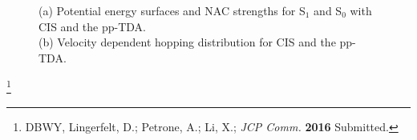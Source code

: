 \documentclass[usepdftitle=false,10pt]{beamer}
\newcommand\blfootnote[1]{%
  \begingroup
  \renewcommand\thefootnote{}\footnote{#1}%
  \addtocounter{footnote}{-1}%
  \endgroup
}
\begin{document}
\begin{frame}
\begin{figure}
\begin{subfigure}[b]{0.40\textwidth}
  \caption{ }
  \label{fig:hops}
  \end{subfigure}
  \vspace{-0.4cm}
  \caption{(a) Potential energy surfaces and NAC strengths for S$_1$ and S$_0$ with CIS
  and the pp-TDA.\\
  (b) Velocity dependent hopping distribution for CIS and the pp-TDA.}
  \end{figure}
  \blfootnote{\tiny DBWY, Lingerfelt, D.; Petrone, A.; Li, X.; \emph{JCP Comm.} \textbf{2016} Submitted.}
\end{frame}
\end{document}
